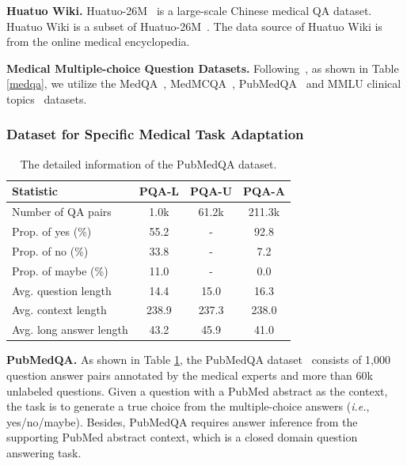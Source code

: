 \documentclass{article} %
\begin{document}
\textbf{Huatuo Wiki.} Huatuo-26M~\citep{li2023huatuo26m} is a large-scale Chinese medical QA dataset. Huatuo Wiki is a subset of Huatuo-26M~\citep{li2023huatuo26m}. The data source of Huatuo Wiki is from the online medical encyclopedia. 

\textbf{Medical Multiple-choice Question Datasets.} Following~\citep{singhal2023expertlevel}, as shown in Table \ref{medqa}, we utilize the MedQA~\citep{jin2021disease}, MedMCQA~\citep{pal2022medmcqa}, PubMedQA~\citep{jin-etal-2019-pubmedqa} and MMLU clinical topics~\citep{hendrycks2020measuring} datasets.








\subsubsection{Dataset for Specific Medical Task Adaptation}
\begin{table}
\centering
\caption{The detailed information of the PubMedQA dataset.}
\label{pubmedqa_tab}
\begin{tabular}{lccc}
\toprule
\textbf{Statistic}      & \textbf{PQA-L} & \textbf{PQA-U} & \textbf{PQA-A} \\ \midrule
Number of QA pairs      & 1.0k           & 61.2k          & 211.3k         \\
Prop. of yes (\%)       & 55.2           & -              & 92.8           \\
Prop. of no (\%)        & 33.8           & -              & 7.2            \\
Prop. of maybe (\%)     & 11.0           & -              & 0.0            \\ \midrule
Avg. question length    & 14.4           & 15.0           & 16.3           \\
Avg. context length     & 238.9          & 237.3          & 238.0          \\
Avg. long answer length & 43.2           & 45.9           & 41.0          \\ \midrule
\end{tabular}
\end{table}
\textbf{PubMedQA.} As shown in Table \ref{pubmedqa_tab}, the PubMedQA dataset~\citep{jin-etal-2019-pubmedqa} consists of 1,000 question answer pairs annotated by the medical experts and more than 60k unlabeled questions. Given a question with a PubMed abstract as the context, the task is to generate a true choice from the multiple-choice answers (\textit{i.e.}, yes/no/maybe). Besides, PubMedQA requires answer inference from the supporting PubMed abstract context, which is a closed domain question answering task. 
\end{document}

